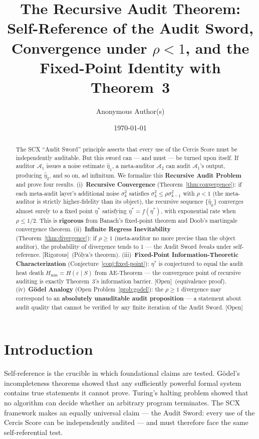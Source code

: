 \documentclass[12pt,a4paper]{article}
\title{\bfseries The Recursive Audit Theorem:\\
Self-Reference of the Audit Sword,\\
Convergence under $\rho<1$, and the\\
Fixed-Point Identity with Theorem~3}
\author{Anonymous Author(s)}
\date{\today}
\newcommand{\rigorous}{\textcolor{green!50!black}{\small\textsf{[Rigorous]}}}
\newcommand{\openquest}{\textcolor{red!70!black}{\small\textsf{[Open]}}}
\newcommand{\cA}{\mathcal{A}}
\begin{document}
\maketitle

\begin{abstract}
The SCX ``Audit Sword'' principle asserts that every use of the Cercis Score
must be independently auditable.  But this sword can — and must — be turned
upon itself.  If auditor $\cA_1$ issues a noise estimate $\hat{\eta}_1$, a
meta-auditor $\cA_2$ can audit $\cA_1$'s output, producing $\hat{\eta}_2$,
and so on, ad infinitum.  We formalize this \textbf{Recursive Audit Problem}
and prove four results.  (i)~\textbf{Recursive Convergence}
(Theorem~\ref{thm:convergence}): if each meta-audit layer's additional noise
$\sigma_k^2$ satisfies $\sigma_k^2\leq\rho\sigma_{k-1}^2$ with $\rho<1$ (the
meta-auditor is strictly higher-fidelity than its object), the recursive
sequence $\{\hat{\eta}_k\}$ converges almost surely to a fixed point $\eta^*$
satisfying $\eta^*=f(\eta^*)$, with exponential rate when $\rho\leq1/2$.  This
is \textbf{rigorous} from Banach's fixed-point theorem and Doob's martingale
convergence theorem.  (ii)~\textbf{Infinite Regress Inevitability}
(Theorem~\ref{thm:divergence}): if $\rho\geq1$ (meta-auditor no more precise
than the object auditor), the probability of divergence tends to 1 — the Audit
Sword \emph{breaks} under self-reference.  \rigorous~(P\'olya's theorem).
(iii)~\textbf{Fixed-Point Information-Theoretic Characterization}
(Conjecture~\ref{conj:fixed-point}): $\eta^*$ is conjectured to equal the
audit heat death $H_{\min}=H(\varepsilon\mid S)$ from AE-Theorem — the
convergence point of recursive auditing is exactly Theorem~3's information
barrier.  \openquest~(equivalence proof).  (iv)~\textbf{G\"odel Analogy}
(Open Problem~\ref{prob:godel}): the $\rho\geq1$ divergence may correspond to
an \textbf{absolutely unauditable audit proposition} — a statement about audit
quality that cannot be verified by any finite iteration of the Audit Sword.
\openquest
\end{abstract}

\section{Introduction}

Self-reference is the crucible in which foundational claims are tested.
G\"odel's incompleteness theorems showed that any sufficiently powerful formal
system contains true statements it cannot prove.  Turing's halting problem
showed that no algorithm can decide whether an arbitrary program terminates.
The SCX framework makes an equally universal claim — the Audit Sword: every use
of the Cercis Score can be independently audited — and must therefore face the
same self-referential test.
\end{document}
